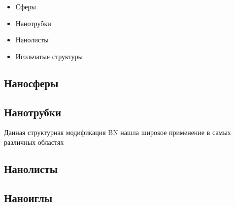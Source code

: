 \begin{itemize}
    \item Сферы 
    \item Нанотрубки
    \item Нанолисты
    \item Игольчатые структуры
\end{itemize}

\subsection{Наносферы}%
\label{sub:Наносферы}


\subsection{Нанотрубки}%
\label{sub:Нанотрубки}


Данная структурная модификация BN нашла широкое применение в самых 
различных областях 

\subsection{Нанолисты}%
\label{sub:Нанолисты}

\subsection{Наноиглы}%
\label{sub:Наноиглы}



